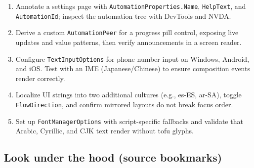\begin{enumerate}
\def\labelenumi{\arabic{enumi}.}
\tightlist
\item
  Annotate a settings page with
  \passthrough{\lstinline!AutomationProperties.Name!},
  \passthrough{\lstinline!HelpText!}, and
  \passthrough{\lstinline!AutomationId!}; inspect the automation tree
  with DevTools and NVDA.
\item
  Derive a custom \passthrough{\lstinline!AutomationPeer!} for a
  progress pill control, exposing live updates and value patterns, then
  verify announcements in a screen reader.
\item
  Configure \passthrough{\lstinline!TextInputOptions!} for phone number
  input on Windows, Android, and iOS. Test with an IME
  (Japanese/Chinese) to ensure composition events render correctly.
\item
  Localize UI strings into two additional cultures (e.g., es-ES, ar-SA),
  toggle \passthrough{\lstinline!FlowDirection!}, and confirm mirrored
  layouts do not break focus order.
\item
  Set up \passthrough{\lstinline!FontManagerOptions!} with
  script-specific fallbacks and validate that Arabic, Cyrillic, and CJK
  text render without tofu glyphs.
\end{enumerate}

\subsection{Look under the hood (source
bookmarks)}\label{look-under-the-hood-source-bookmarks-13}

